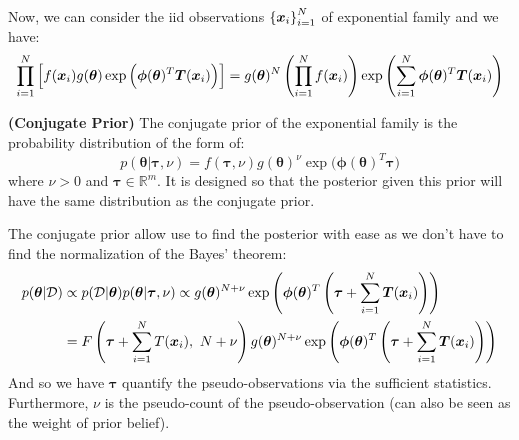 \begin{remark}
    Now, we can consider the iid observations $\left\{ \boldsymbol x_i \right\}^N_{i=1}$ of exponential family and we have:
    \begin{equation*}
        \prod_{i=1}^N \left[ f(\boldsymbol x_i)g(\boldsymbol \theta) \exp\Big( \boldsymbol \phi(\boldsymbol \theta)^T\boldsymbol T(\boldsymbol x_i) \Big) \right] = g(\boldsymbol \theta)^N\left( \prod^N_{i=1}f(\boldsymbol x_i) \right)\exp\left( \sum^N_{i=1}\boldsymbol \phi(\boldsymbol \theta)^T\boldsymbol T(\boldsymbol x_i) \right)
    \end{equation*}
\end{remark}

\begin{definition}{\textbf{(Conjugate Prior)}}
    The conjugate prior of the exponential family is the probability distribution of the form of:
    \begin{equation*}
        p(\boldsymbol \theta | \boldsymbol \tau, \nu) = f(\boldsymbol \tau, \nu) g(\boldsymbol \theta)^\nu \exp\Big( \boldsymbol \phi(\boldsymbol \theta)^T\boldsymbol \tau \Big)
    \end{equation*}
    where $\nu > 0$ and $\boldsymbol \tau \in \mathbb{R}^m$. It is designed so that the posterior given this prior will have the same distribution as the conjugate prior. 
\end{definition}

\begin{remark}
    The conjugate prior allow use to find the posterior with ease as we don't have to find the normalization of the Bayes' theorem:
    \begin{equation*}
    \begin{aligned}
        p(\boldsymbol \theta | \mathcal{D}) &\propto p(\mathcal{D}|\boldsymbol \theta)p(\boldsymbol \theta | \boldsymbol \tau, \nu) \propto g(\boldsymbol \theta)^{N+\nu}\exp\left( \boldsymbol \phi(\boldsymbol \theta)^T\left( \boldsymbol \tau + \sum^N_{i=1} \boldsymbol T(\boldsymbol x_i) \right) \right) \\ 
        &= F\left(  \boldsymbol \tau + \sum^N_{i=1}T(\boldsymbol x_i), \ N+\nu   \right) g(\boldsymbol \theta)^{N+\nu}\exp\left( \boldsymbol \phi(\boldsymbol \theta)^T\left( \boldsymbol \tau + \sum^N_{i=1} \boldsymbol T(\boldsymbol x_i) \right) \right) 
    \end{aligned}
    \end{equation*}
    And so we have $\boldsymbol \tau$ quantify the pseudo-observations via the sufficient statistics. Furthermore, $\nu$ is the pseudo-count of the pseudo-observation (can also be seen as the weight of prior belief). 
\end{remark}

